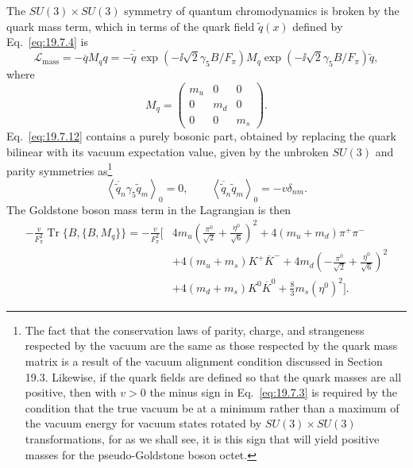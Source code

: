 The $SU(3)\times SU(3)$ symmetry of quantum chromodynamics is broken by the quark mass term, which in terms of the quark field $\widetilde q(x)$ defined by Eq.~\eqref{eq:19.7.4} is
\begin{equation}
\mathcal L_{\text{mass}}
=-\overline q M_q q
=-\overline{\widetilde q}\,
\exp\left(-\ii\sqrt2\gamma_5B/F_\pi\right)
M_q
\exp\left(-\ii\sqrt2\gamma_5B/F_\pi\right)
\widetilde q,
\tag{19.7.12}\label{eq:19.7.12}
\end{equation}
where
\begin{equation}
M_q=
\begin{pmatrix}
m_u&0&0\\
0&m_d&0\\
0&0&m_s
\end{pmatrix}.
\tag{19.7.13}\label{eq:19.7.13}
\end{equation}
Eq.~\eqref{eq:19.7.12} contains a purely bosonic part, obtained by replacing the quark bilinear with its vacuum expectation value, given by the unbroken $SU(3)$ and parity symmetries as\footnote{The fact that the conservation laws of parity, charge, and strangeness respected by the vacuum are the same as those respected by the quark mass matrix is a result of the vacuum alignment condition discussed in Section 19.3. Likewise, if the quark fields are defined so that the quark masses are all positive, then with $v>0$ the minus sign in Eq.~\eqref{eq:19.7.3} is required by the condition that the true vacuum be at a minimum rather than a maximum of the vacuum energy for vacuum states rotated by $SU(3)\times SU(3)$ transformations, for as we shall see, it is this sign that will yield positive masses for the pseudo-Goldstone boson octet.}
\begin{equation}
\left\langle\overline{\widetilde q}_n\gamma_5\widetilde q_m\right\rangle_0=0,
\qquad
\left\langle\overline{\widetilde q}_n\widetilde q_m\right\rangle_0
=-v\delta_{nm}.
\tag{19.7.14}\label{eq:19.7.14}
\end{equation}
The Goldstone boson mass term in the Lagrangian is then
\begin{equation}
\begin{split}
-\frac{v}{F_\pi^2}\operatorname{Tr}\{B,\{B,M_q\}\}
=-\frac{v}{F_\pi^2}\bigg[
&4m_u\left(\frac{\pi^0}{\sqrt2}+\frac{\eta^0}{\sqrt6}\right)^2
+4(m_u+m_d)\pi^+\pi^-
\\
&+4(m_u+m_s)K^+\overline K^-
+4m_d\left(-\frac{\pi^0}{\sqrt2}+\frac{\eta^0}{\sqrt6}\right)^2
\\
&+4(m_d+m_s)K^0\overline K^0
+\frac83m_s(\eta^0)^2
\bigg].
\end{split}
\tag{19.7.15}\label{eq:19.7.15}
\end{equation}
